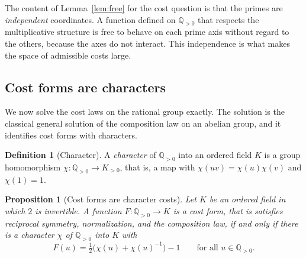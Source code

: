 \documentclass[11pt,a4paper]{article}
\newtheorem{proposition}[theorem]{Proposition}
\theoremstyle{definition}
\newtheorem{definition}[theorem]{Definition}
\theoremstyle{remark}
\newcommand{\Qpos}{\mathbb{Q}_{>0}}
\begin{document}
The content of Lemma~\ref{lem:free} for the cost question is that the primes are
\emph{independent} coordinates. A function defined on $\Qpos$ that respects the
multiplicative structure is free to behave on each prime axis without regard to
the others, because the axes do not interact. This independence is what makes the
space of admissible costs large.

\subsection{Cost forms are characters}

We now solve the cost laws on the rational group exactly. The solution is the
classical general solution of the composition law on an abelian group, and it
identifies cost forms with characters.

\begin{definition}[Character]\label{def:char}
A \emph{character} of $\Qpos$ into an ordered field $K$ is a group homomorphism
$\chi \colon \Qpos \to K_{>0}$, that is, a map with $\chi(uv) = \chi(u)\chi(v)$
and $\chi(1) = 1$.
\end{definition}

\begin{proposition}[Cost forms are character costs]\label{prop:charcost}
Let $K$ be an ordered field in which $2$ is invertible. A function
$F \colon \Qpos \to K$ is a cost form, that is satisfies reciprocal symmetry,
normalization, and the composition law, if and only if there is a character
$\chi$ of $\Qpos$ into $K$ with
\[
  F(u) = \tfrac{1}{2}\bigl(\chi(u) + \chi(u)^{-1}\bigr) - 1
  \qquad\text{for all } u \in \Qpos .
\]
\end{proposition}
\end{document}
